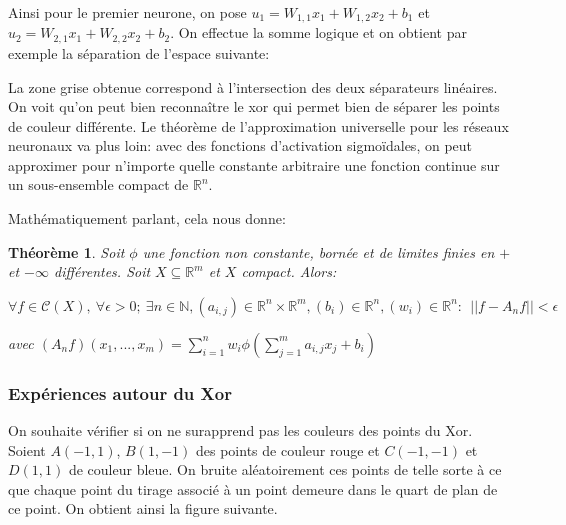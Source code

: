 \documentclass{article}
\newtheorem{thm}{Théorème}
\newcommand{\R}{\mathbb R}
\begin{document}
\noindent Ainsi pour le premier neurone, on pose $u_1=W_{1,1}x_1+W_{1,2}x_2+b_1$ et $u_2=W_{2,1}x_1+W_{2,2}x_2+b_2$. On effectue la somme logique et on obtient par exemple la séparation de l'espace suivante:
\begin{center}
\end{center}

\noindent La zone grise obtenue correspond à l'intersection des deux séparateurs linéaires. On voit qu'on peut bien reconnaître le xor qui permet bien de séparer les points de couleur différente. Le théorème de l'approximation universelle pour les réseaux neuronaux va plus loin: avec des fonctions d'activation sigmoïdales, on peut approximer pour n'importe quelle constante arbitraire une fonction continue sur un sous-ensemble compact de $\R^n$.


\newpage
\noindent Mathématiquement parlant, cela nous donne:
\begin{thm}
Soit $\phi$ une fonction non constante, bornée et de limites finies en $+$ et $-\infty$ différentes. Soit $X \subseteq \R^m$ et $X$ compact. Alors:

\noindent $\forall f \in \mathcal{C}(X),~\forall \epsilon>0;~\exists n\in \mathbb{N},(a_{i,j})\in\R^n\times\R^m,(b_i)\in \R^n,(w_i)\in\R^n:~~||f-A_n f||<\epsilon$

\noindent avec $(A_n f)(x_1,...,x_m)=\displaystyle\sum_{i=1}^n w_i \phi\left(\displaystyle\sum_{j=1}^m a_{i,j}x_j+b_i\right)$
\end{thm}

\subsubsection{Expériences autour du Xor}

\noindent On souhaite vérifier si on ne surapprend pas les couleurs des points du Xor. Soient $A(-1,1)$, $B(1,-1)$ des points de couleur rouge et $C(-1,-1)$ et $D(1,1)$ de couleur bleue. On bruite aléatoirement ces points de telle sorte à ce que chaque point du tirage associé à un point demeure dans le quart de plan de ce point. On obtient ainsi la figure suivante.
\end{document}
